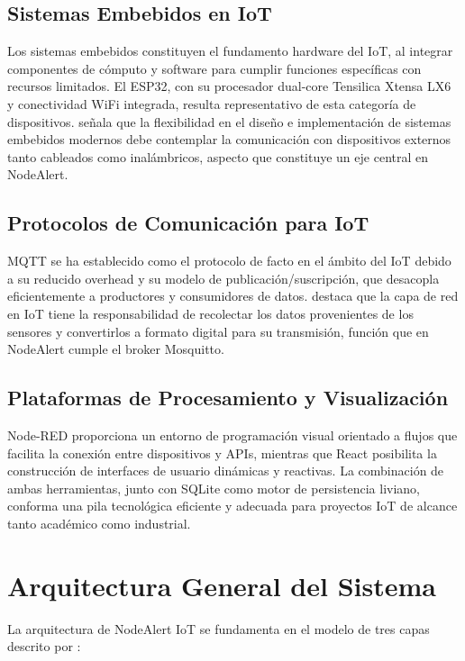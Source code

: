 \documentclass[11pt,a4paper]{article}
\begin{document}
\subsection{Sistemas Embebidos en IoT}
Los sistemas embebidos constituyen el fundamento hardware del IoT, al integrar componentes de c\'omputo y software para cumplir funciones espec\'ificas con recursos limitados. El ESP32, con su procesador dual-core Tensilica Xtensa LX6 y conectividad WiFi integrada, resulta representativo de esta categor\'ia de dispositivos. \citet{cayssials2014} se\~nala que la flexibilidad en el dise\~no e implementaci\'on de sistemas embebidos modernos debe contemplar la comunicaci\'on con dispositivos externos tanto cableados como inal\'ambricos, aspecto que constituye un eje central en NodeAlert.

\subsection{Protocolos de Comunicaci\'on para IoT}
MQTT se ha establecido como el protocolo de facto en el \'ambito del IoT debido a su reducido overhead y su modelo de publicaci\'on/suscripci\'on, que desacopla eficientemente a productores y consumidores de datos. \citet{rivera2024} destaca que la capa de red en IoT tiene la responsabilidad de recolectar los datos provenientes de los sensores y convertirlos a formato digital para su transmisi\'on, funci\'on que en NodeAlert cumple el broker Mosquitto.

\subsection{Plataformas de Procesamiento y Visualizaci\'on}
Node-RED proporciona un entorno de programaci\'on visual orientado a flujos que facilita la conexi\'on entre dispositivos y APIs, mientras que React posibilita la construcci\'on de interfaces de usuario din\'amicas y reactivas. La combinaci\'on de ambas herramientas, junto con SQLite como motor de persistencia liviano, conforma una pila tecnol\'ogica eficiente y adecuada para proyectos IoT de alcance tanto acad\'emico como industrial.

\section{Arquitectura General del Sistema}
La arquitectura de NodeAlert IoT se fundamenta en el modelo de tres capas descrito por \citet{rivera2024}:
\end{document}
